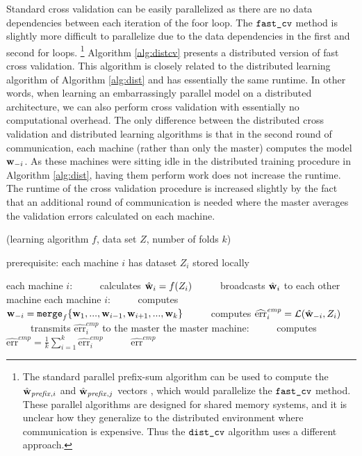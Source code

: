 \documentclass[thesis.tex]{subfiles}
\newcommand{\riskemp}{\widehat{\textrm{err}}^\textit{emp}}
\newcommand{\fastcv}{\mkprocedure{fast\_cv}}
\newcommand{\distcv}{\mkprocedure{dist\_cv}}
\newcommand{\merge}{\mkprocedure{merge}}
\newcommand{\wprefix}{{\hat\w_\textit{prefix}}{}}
\begin{document}
Standard cross validation can be easily parallelized as there are no data dependencies between each iteration of the foor loop. 
The $\fastcv$ method is slightly more difficult to parallelize due to the data dependencies in the first and second for loops.%
\footnote{
    The standard parallel prefix-sum algorithm can be used to compute the $\wprefix_{,i}$ and $\wprefix_{,j}$ vectors \citep{ladner1980parallel,blelloch1990prefix},
    which would parallelize the $\fastcv$ method.
    These parallel algorithms are designed for shared memory systems,
    and it is unclear how they generalize to the distributed environment where communication is expensive.
    Thus the $\distcv$ algorithm uses a different approach.
}
Algorithm \ref{alg:distcv} presents a distributed version of fast cross validation.
This algorithm is closely related to the distributed learning algorithm of Algorithm \ref{alg:dist} and has essentially the same runtime.
In other words, when learning an embarrassingly parallel model on a distributed architecture,
we can also perform cross validation with essentially no computational overhead.
The only difference between the distributed cross validation and distributed learning algorithms is that in the second round of communication, 
each machine (rather than only the master) computes the model $\mathbf w_{-i}$.
As these machines were sitting idle in the distributed training procedure in Algorithm \ref{alg:dist},
having them perform work does not increase the runtime.
The runtime of the cross validation procedure is increased slightly by the fact that an additional round of communication is needed where the master averages the validation errors calculated on each machine.

\begin{algorithm}[t]
    \caption{\distcv(learning algorithm $f$, data set $Z$, number of folds $k$)}
    \label{alg:distcv}
    \vspace{0.1in}
    prerequisite: each machine $i$ has dataset $Z_i$ stored locally
    \begin{algorithmic}[1]
        \State each machine $i$:
        \State ~~~~~calculates ${\hat{\mathbf w}}_i = f(Z_i)$
        \State ~~~~~broadcasts ${\hat{\mathbf w}}_i$ to each other machine
        \State each machine $i$:
        \State ~~~~~computes $\w_{-i} = \merge_f\{\w_1,...,\w_{i-1},\w_{i+1},...,\w_k\}$
        \State ~~~~~computes $\riskemp_i = \Loss(\what_{-i},Z_i)$
        \State ~~~~~transmits $\riskemp_i$ to the master
        \State the master machine:
        \State ~~~~~computes $\riskemp = \frac 1 k \sum_{i=1}^k \riskemp_i$
        \State ~~~~~\Return $\riskemp$
    \end{algorithmic}
\end{algorithm}
\end{document}
